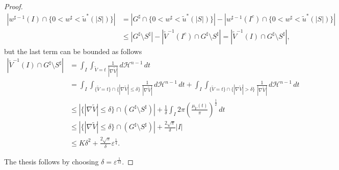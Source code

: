 \documentclass[oneside,a4paper,11pt,notitlepage]{article}
\newcommand{\abs}[1]{{\left|#1\right|}}
\theoremstyle{definition}
\theoremstyle{plain}
\theoremstyle{definition}
\begin{document}
\begin{proof}
\begin{equation*}
\begin{aligned}
         \abs{w^{\sharp-1}(I) \cap \{0 <w^\sharp < {\tilde u}^\ast(\abs{S})\}}&=\abs{G^\sharp \cap  \{0 <w^\sharp < {\tilde u}^\ast(\abs{S})\}}-\abs{w^{\sharp-1}(I^c) \cap \{0 <w^\sharp < {\tilde u}^\ast(\abs{S})\}}\\ &\leq \abs{G^\sharp \setminus  S^\sharp}-\abs{\tilde V^{-1}(I^c)\cap G^\sharp\setminus S^\sharp}=\abs{\tilde V^{-1}(I)\cap G^\sharp\setminus S^\sharp},
    \end{aligned}
    \end{equation*}
    but the last term can be bounded as follows
    \begin{equation*}
        \begin{aligned}
           \abs{\tilde V^{-1}(I)\cap G^\sharp\setminus S^\sharp}&=\int_I\int_{\tilde V = t}\frac{1}{\abs{\nabla \tilde V}}\,d\mathcal{H}^{n-1}\,dt\\&=\int_I\int_{\{\tilde V = t\}\cap\{\abs{\nabla \tilde V}\leq\delta\}}\frac{1}{\abs{\nabla \tilde V}}\,d\mathcal{H}^{n-1}\,dt+\int_I\int_{\{\tilde V = t\}\cap\{\abs{\nabla \tilde V}>\delta\}}\frac{1}{\abs{\nabla \tilde V}}\,d\mathcal{H}^{n-1}\,dt\\&\leq\abs{\{\abs{\nabla \tilde V}\leq\delta\} \cap (G^\sharp \setminus S^\sharp)}+\frac{1}{\delta}\int_I2\pi\left(\frac{\mu_{\tilde V}(t)}{\pi}\right)^\frac{1}{2}\,dt\\&\leq\abs{\{\abs{\nabla \tilde V}\leq\delta\}\cap (G^\sharp \setminus S^\sharp)}+\frac{2\sqrt{\pi}}{\delta}\abs{I}\\&\leq K \delta^2+\frac{2\sqrt{\pi}}{\delta}\varepsilon^{\frac 14}.
        \end{aligned}
    \end{equation*}

    The thesis follows by choosing $\delta=\varepsilon^\frac{1}{12}$.
\end{proof}
\end{document}
